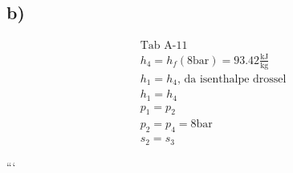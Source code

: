 

\subsection*{b)}

\begin{align*}
    &\text{Tab A-11} \\
    &h_4 = h_f (8 \text{bar}) = 93.42 \frac{\text{kJ}}{\text{kg}} \\
    &h_1 = h_4 \text{, da isenthalpe drossel} \\
    &h_1 = h_4 \\
    &p_1 = p_2 \\
    &p_2 = p_4 = 8 \text{bar} \\
    &s_2 = s_3
\end{align*}

```